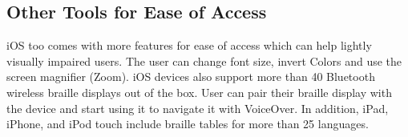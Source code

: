 \subsection{Other Tools for Ease of Access}
iOS too comes with more features for ease of access which can help lightly visually impaired users. The user can change font size, invert Colors and use the screen magnifier (Zoom).
iOS devices also support more than 40 Bluetooth wireless braille displays out of the box. User can pair their braille display with the device and start using it to navigate it with VoiceOver. In addition, iPad, iPhone, and iPod touch include braille tables for more than 25 languages.

\endinput